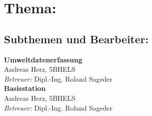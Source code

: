 

\chapter*{Thema: \newline \htlArbeitsthema }



\section*{Subthemen und Bearbeiter:}


\textbf{Umweltdatenerfassung}\\ 
Andreas Herz, 5BHELS\\
\emph{Betreuer:} Dipl.-Ing. Roland Sageder\\[2ex] 
%
\textbf{Basisstation}\\ 
Andreas Herz, 5BHELS\\
\emph{Betreuer:} Dipl.-Ing. Roland Sageder\\[2ex] 





\pagebreak
\thispagestyle{empty}

